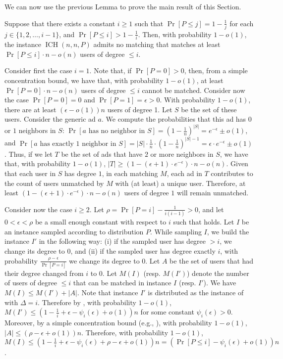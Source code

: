 \documentclass[11pt]{article}
\DeclareMathOperator*{\irregularcuckoohashing}{ICH}
\begin{document}
We can now use the previous Lemma to prove the main result of this Section. \begin{theoremrep}\label{thm:extremality-arbitrary-distr}
Suppose that there exists a constant $i \ge 1$ such that $\Pr[P\leq j] = 1- \frac1j$ for each $j \in \{1,2,\ldots,i-1\}$, and $\Pr[P\leq i] > 1 - \frac1{i}$. Then, with probability $1-o(1)$,  the instance $\irregularcuckoohashing(n,n,P)$ admits no matching that matches at least $\Pr[P\leq i] \cdot n - o(n)$ users of degree $\le i$.
\end{theoremrep}
\begin{appendixproof}
Consider first the case $i=1$. Note that, if $\Pr[P=0] > 0$, then, from a simple concentration bound, we have that, with probability $1-o(1)$, at least $\Pr[P=0] \cdot n - o(n)$ users of degree $\leq i$ cannot be matched. Consider now the case $\Pr[P=0]=0$ and $\Pr[P=1] = \epsilon > 0$. With probability $1-o(1)$, there are at least $(\epsilon - o(1))n$ users of degree 1. Let $S$ be the set of these users. Consider the generic ad $a$. We compute the probabilities that this ad has $0$ or $1$ neighbors in $S$: $\Pr[a \text{ has no neighbor in } S] = \left(1-\frac1n\right)^{|S|} = e^{-\epsilon} \pm o(1)$, and $\Pr[a \text{ has exactly 1 neighbor in } S] = |S| \cdot \frac1n \cdot \left(1-\frac1n\right)^{|S|-1} = \epsilon \cdot e^{-\epsilon} \pm o(1)$. Thus, if we let $T$ be the set of ads that have $2$ or more neighbors in $S$, we have that, with probability $1-o(1)$, $|T| \ge (1 - (\epsilon + 1)\cdot e^{-\epsilon}) \cdot n - o(n)$. Given that each user in $S$ has degree $1$, in each matching $M$, each ad in $T$ contributes to the count of users unmatched by $M$ with (at least) a unique user. Therefore, at least $(1 - (\epsilon + 1)\cdot e^{-\epsilon})\cdot n - o(n)$ users of degree $1$ will remain unmatched.

Consider now the case $i\geq 2$. Let $\rho=\Pr[P=i] - \frac{1}{i(i-1)} > 0$, and let $0<\epsilon < \rho$ be a small enough constant with respect to $i$ such that  holds. Let $I$ be an instance sampled according to distribution $P$. While sampling $I$, we build the instance $I'$ in the following way: (i) if the sampled user has degree $>i$, we change its degree to $0$, and (ii) if the sampled user has degree exactly $i$, with probability $\frac{\rho - \epsilon}{\Pr[P=i]}$ we change its degree to $0$. Let $A$ be the set of users that had their degree changed from $i$ to $0$. Let $M(I)$ (resp. $M(I')$) denote the number of users of degree $\leq i$ that can be matched in instance $I$ (resp. $I'$). We have $M(I) \leq M(I') + |A|$. Note that instance $I'$ is distributed as the instance of  with $\Delta=i$. Therefore by , with probability $1-o(1)$, $M(I')\leq (1-\frac{1}{i}+\epsilon-\psi_i(\epsilon) +o(1))n$ for some constant $\psi_i(\epsilon)>0$. Moreover, by a simple concentration bound (e.g., ), with probability $1-o(1)$, $|A|\leq (\rho - \epsilon + o(1))n$. Therefore, with probability $1-o(1)$, $M(I)\leq (1-\frac{1}{i}+\epsilon-\psi_i(\epsilon)+\rho-\epsilon+o(1))n=(\Pr[P \leq i] - \psi_i(\epsilon) + o(1))n$. \end{appendixproof}
\end{document}
